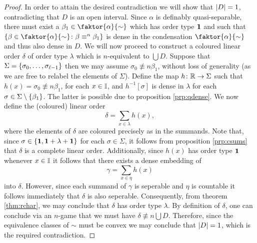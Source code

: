\begin{proof}
		\smallskip	In order to attain the desired contradiction we will show that $\left\lvert D\right\rvert=1$, contradicting that $D$ is an open interval.  Since $\alpha$ is definably quasi-separable, there must exist a $\beta_1\in\faktor{\alpha}{\sim}$ which has order type $\mathbf{1}$ and such that $\setbuild{\beta\in\faktor{\alpha}{\sim}}{\beta\nequiv{n}\beta_1}$ is dense in the condensation $\faktor{\alpha}{\sim}$ and thus also dense in $D$.  We will now proceed to construct a coloured linear order $\delta$ of order type $\lambda$ which is $n$-equivalent to $\bigcup D$.  Suppose that $\Sigma=\{\sigma_0,\dotsc,\sigma_{\ell-1}\}$ then we may assume $\sigma_0\nequiv{n}\beta_1$, without loss of generality (as we are free to relabel the elements of $\Sigma$).  Define the map $h\colon\mathbb{R}\to\Sigma$ such that $h(x)=\sigma_0\nequiv{n}\beta_1$, for each $x\in\mathbb{I}$, and $h^{-1}[\sigma]$ is dense in $\lambda$ for each $\sigma\in\Sigma\setminus\{\beta_1\}$.  The latter is possible due to proposition \ref{prp:qdense}.  We now define the (coloured) linear order
		\begin{equation}
			\delta=\sum_{x\in\lambda}h(x),
		\end{equation}
		where the elements of $\delta$ are coloured precisely as in the summands.  Note that, since $\sigma\in\{\mathbf{1},\mathbf{1}+\lambda+\mathbf{1}\}$ for each $\sigma\in\Sigma$, it follows from proposition \ref{prp:csums} that $\delta$ is a complete linear order.  Additionally, since $h(x)$ has order type $\mathbf{1}$ whenever $x\in\mathbb{I}$ it follows that there exists a dense embedding of
		\begin{equation}
			\gamma=\sum_{x\in\eta}h(x)
		\end{equation}
		into $\delta$.  However, since each summand of $\gamma$ is seperable and $\eta$ is countable it follows immediately that $\delta$ is also seperable.  Consequently, from theorem \ref{thm:rchar}, we may conclude that $\delta$ has order type $\lambda$.  By definition of $\delta$, one can conclude via an $n$-game that we must have $\delta\nequiv{n}\bigcup D$.  Therefore, since the equivalence classes of $\sim$ must be convex we may conclude that $\left\lvert D\right\rvert=1$, which is the required contradiction.
	\end{proof}

